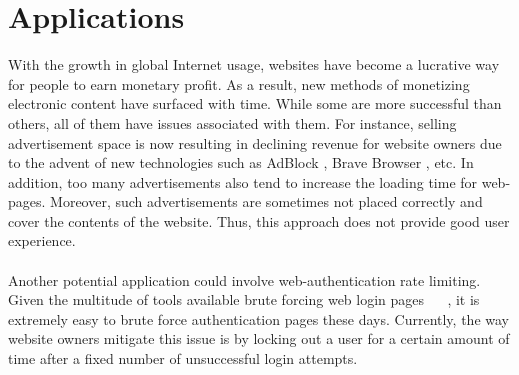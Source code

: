 \documentclass[runningheads]{llncs}
\begin{document}
\section{Applications}
With the growth in global Internet usage, websites have become a lucrative way for people to earn monetary profit. As a result, new methods of monetizing electronic content have surfaced with time. While some are more successful than others, all of them have issues associated with them. For instance, selling advertisement space is now resulting in declining revenue \cite{decliningRevenue} for website owners due to the advent of new technologies such as AdBlock \cite{Adblock}, Brave Browser \cite{BraveBrowser}, etc. In addition, too many advertisements also tend to increase the loading time for web-pages. Moreover, such advertisements are sometimes not placed correctly and cover the contents of the website. Thus, this approach does not provide good user experience. \\ \\
Another potential application could involve web-authentication rate limiting. Given the multitude of tools available brute forcing web login pages ~\cite{hydra} ~\cite{burpsuite}, it is extremely easy to brute force authentication pages these days. Currently, the way website owners mitigate this issue is by locking out a user for a certain amount of time after a fixed number of unsuccessful login attempts. 
\end{document}
